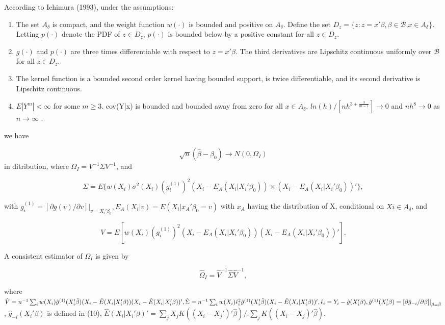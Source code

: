 \documentclass[a4paper]{article}
\begin{document}
\begin{theorem}
According to Ichimura (1993), under the assumptions:

\begin{enumerate}
	\item The set $A_\delta$ is compact, and the weight function $w(\cdot)$ is bounded and positive on $A_\delta$. Define the set $D_z = \{ z : z = x'\beta, \beta \in \mathcal{B}$,$ x \in A_\delta\}$. Letting $p(\cdot)$ denote the PDF of $z \in D_z$, $p(\cdot)$ is bounded below by a positive constant for all $z \in D_z$.
	\item $g(\cdot)$ and $p(\cdot)$ are three times differentiable with respect to $z = x'\beta$. The third derivatives are Lipschitz continuous uniformly over $\mathcal{B}$ for all $z \in D_z$.
	\item The kernel function is a bounded second order kernel having bounded support, is twice differentiable, and its second derivative is Lipschitz continuous.
	\item $E|Y^m| < \infty$ for some $m \geq 3$. cov(Y|x) is bounded and bounded away from zero for all $x \in A_\delta$. $ln(h)/[nh^{3 + \frac{3}{m-1}}] \rightarrow 0$ and $nh^8 \rightarrow 0$ as $n \rightarrow \infty $ .
	
\end{enumerate}

we have

\[ \sqrt{n}(\hat{\beta} - \beta_0) \rightarrow N(0,\Omega_I) \] in ditribution, where $\Omega_I = V^{-1}\Sigma V^{-1}$, and

\[\Sigma = E\{w(X_i)\sigma^2(X_i)(g_i^{(1)})^2(X_i - E_A(X_i|X_i'\beta_0)) \times (X_i - E_A(X_i|X_i'\beta_0))'\},\]

with $g_i^{(1)} = [\partial g(v)/\partial v]|_{v = X_i'\beta_0}, E_A(X_i|v) = E(X_i|x_A'\beta_0 = v)$ with $x_A$ having the distribution of X, conditional on $Xi \in A_\delta$, and

\[ V = E[w(X_i)(g_i^{(1)})^2(X_i - E_A(X_i|X_i'\beta_0))(X_i - E_A(X_i|X_i'\beta_0))'].\]

\end{theorem}


A consistent estimator of $\Omega_I$ is given by

\[ \hat{\Omega}_I = \hat{V}^{-1}\hat{\Sigma}\hat{V}^{-1}, \]

where $\hat{V} = n^{-1}\sum_{i} w(X_i)\hat{g}^{(1)}(X_i'\hat{\beta})(X_i - \hat{E}(X_i|X_i'\beta))(X_i - \hat{E}(X_i|X_i'\beta))', \hat{\Sigma} = n^{-1}\sum_{i} w(X_i)\hat{\epsilon}_{i}^{2}\hat{g}^{(1)}(X_i'\hat{\beta})(X_i - \hat{E}(X_i|X_i'\beta))', \hat{\epsilon}_i = Y_i - \hat{g}(X_i'\beta), \hat{g}^{(1)}(X_i'\beta) \linebreak
= [\partial \hat{g}_{-i}/\partial \beta]|_{\beta=\hat{\beta}}$, $\hat{g}_{-i}(X_i'\beta)$ is defined in (10), $\hat{E}(X_i|X_i'\beta)' = \sum_{j} X_jK((X_i - X_j')'\hat{\beta})/ .\sum_{j}K((X_i - X_j)'\hat{\beta}).$
\end{document}
